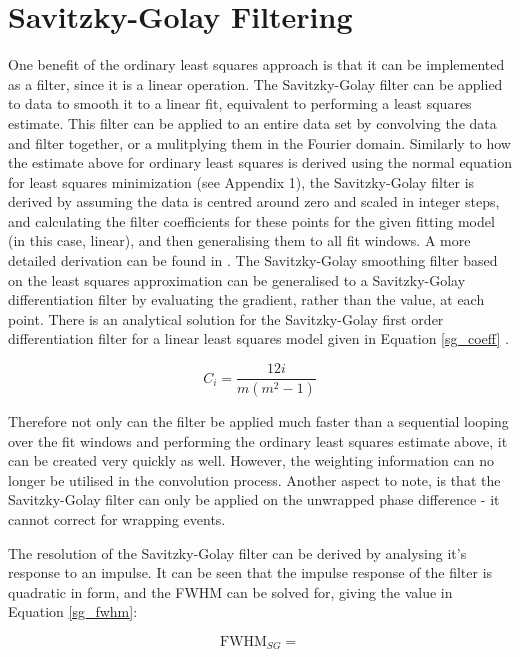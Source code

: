\section{Savitzky-Golay Filtering}
One benefit of the ordinary least squares approach is that it can be implemented as a filter, since it is a linear operation. The Savitzky-Golay filter \cite{savitzky_smoothing_1964} can be applied to data to smooth it to a linear fit, equivalent to performing a least squares estimate. This filter can be applied to an entire data set by convolving the data and filter together, or a mulitplying them in the Fourier domain. Similarly to how the estimate above for ordinary least squares is derived using the normal equation for least squares minimization (see Appendix 1), the Savitzky-Golay filter is derived by assuming the data is centred around zero and scaled in integer steps, and calculating the filter coefficients for these points for the given fitting model (in this case, linear), and then generalising them to all fit windows. A more detailed derivation can be found in \cite{savitzky_smoothing_1964}. The Savitzky-Golay smoothing filter based on the least squares approximation can be generalised to a Savitzky-Golay differentiation filter by evaluating the gradient, rather than the value, at each point. There is an analytical solution for the Savitzky-Golay first order differentiation filter for a linear least squares model given in Equation \ref{sg_coeff} \cite{madden_comments_1978}.

\begin{equation}
	\label{sg_coeff}
	C_i = \frac{12 i}{m(m^2-1)}
\end{equation}

Therefore not only can the filter be applied much faster than a sequential looping over the fit windows and performing the ordinary least squares estimate above, it can be created very quickly as well. However, the weighting information can no longer be utilised in the convolution process. Another aspect to note, is that the Savitzky-Golay filter can only be applied on the unwrapped phase difference - it cannot correct for wrapping events. 

The resolution of the Savitzky-Golay filter can be derived by analysing it's response to an impulse. It can be seen that the impulse response of the filter is quadratic in form, and the FWHM can be solved for, giving the value in Equation \ref{sg_fwhm}:

\begin{equation}
	\label{sg_fwhm}
	\text{FWHM}_{SG} = 
\end{equation}

